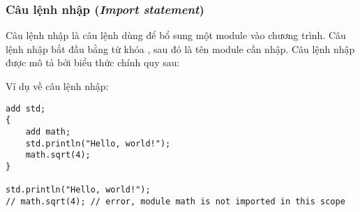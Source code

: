 \subsubsection{Câu lệnh nhập (\textit{Import statement})}

Câu lệnh nhập là câu lệnh dùng để bổ sung một module vào chương trình. Câu lệnh nhập bắt đầu bằng từ khóa , sau đó là tên module cần nhập. Câu lệnh nhập được mô tả bởi biểu thức chính quy sau:

\regeximportstmt

\noindent Ví dụ về câu lệnh nhập:
\begin{lstlisting}[]
add std;
{
    add math;
    std.println("Hello, world!");
    math.sqrt(4);
}

std.println("Hello, world!");
// math.sqrt(4); // error, module math is not imported in this scope
\end{lstlisting}
